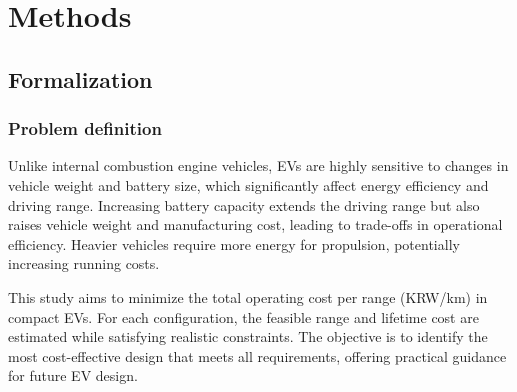 \documentclass[11pt,twocolumn]{article}
\begin{document}
    \section{Methods}
        \subsection{Formalization}
            \label{form}
            \subsubsection{Problem definition}
                Unlike internal combustion engine vehicles, EVs are highly sensitive to changes in vehicle weight and battery size, which significantly affect energy efficiency and driving range. Increasing battery capacity extends the driving range but also raises vehicle weight and manufacturing cost, leading to trade-offs in operational efficiency. Heavier vehicles require more energy for propulsion, potentially increasing running costs.
                \par
                This study aims to minimize the total operating cost per range (KRW/km) in compact EVs. For each configuration, the feasible range and lifetime cost are estimated while satisfying realistic constraints. The objective is to identify the most cost-effective design that meets all requirements, offering practical guidance for future EV design.
\end{document}

